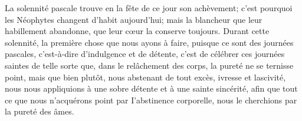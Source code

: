 La solennité pascale trouve en la fête de ce jour son achèvement;
	c’est pourquoi les Néophytes changent d’habit aujourd’hui;
	mais la blancheur que leur habillement abandonne,
	que leur cœur la conserve toujours.
Durant cette solennité, la première chose que nous ayons à faire,
	puisque ce sont des journées pascales,
	c’est-à-dire d’indulgence et de détente,
	c’est de célébrer ces journées saintes
		de telle sorte que, dans le relâchement des corps,
	la pureté ne se ternisse point, mais que bien plutôt,
	nous abstenant de tout excès, ivresse et lascivité,
	nous nous appliquions à une sobre détente et à une sainte sincérité,
	afin que tout ce que nous n’acquérons point par I’abstinence corporelle,
	nous le cherchions par la pureté des âmes.
